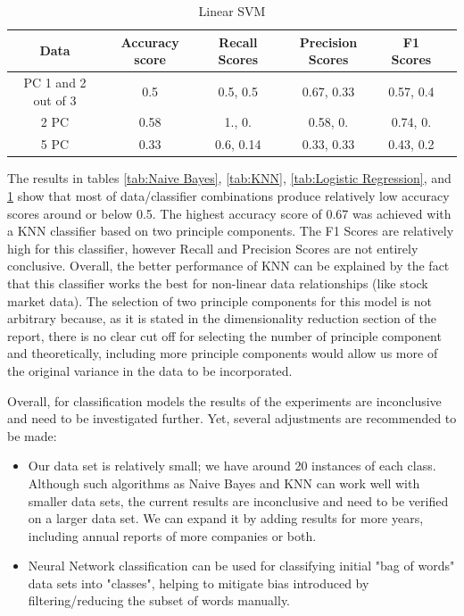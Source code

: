 \documentclass{article}
\begin{document}
\begin{table}[!htb]
    \centering
    \begin{tabular}{c|c|c|c|c|c}
        \textbf{Data} & \textbf{Accuracy score} & \textbf{Recall Scores}& \textbf{Precision Scores}& \textbf{F1 Scores} \\
        \hline
        PC 1 and 2 out of 3 & 0.5 & 0.5, 0.5 & 0.67, 0.33 & 0.57, 0.4\\
        2 PC & 0.58 & 1., 0. & 0.58, 0. & 0.74, 0.\\
        5 PC & 0.33 & 0.6, 0.14 & 0.33, 0.33 & 0.43, 0.2
    \end{tabular}
    \caption{Linear SVM}
    \label{tab:Linear SVM}
\end{table}


The results in tables \ref{tab:Naive Bayes}, \ref{tab:KNN}, \ref{tab:Logistic Regression}, and \ref{tab:Linear SVM} show that most of data/classifier combinations produce relatively low accuracy scores around or below 0.5. The highest accuracy score of 0.67 was achieved with a KNN classifier based on two principle components. The F1 Scores are relatively high for this classifier, however Recall and Precision Scores are not entirely conclusive. Overall, the better performance of KNN can be explained by the fact that this classifier works the best for non-linear data relationships (like stock market data). The selection of two principle components for this model is not arbitrary because, as it is stated in the dimensionality reduction section of the report, there is no clear cut off for selecting the number of principle component and theoretically, including more principle components would allow us more of the original variance in the data to be incorporated. 

Overall, for classification models the results of the experiments are inconclusive and need to be investigated further. Yet, several adjustments are recommended to be made:
\begin{itemize}
    \item Our data set is relatively small; we have around 20 instances of each class. Although such algorithms as Naive Bayes and KNN can work well with smaller data sets, the current results are inconclusive and need to be verified on a larger data set. We can expand it by adding results for more years, including annual reports of more companies or both.
    \item Neural Network classification can be used for classifying initial "bag of words" data sets into "classes", helping to mitigate bias introduced by filtering/reducing the subset of words manually.  
\end{itemize}
\end{document}
